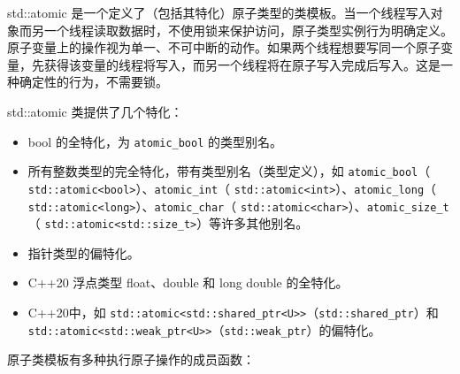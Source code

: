
std::atomic 是一个定义了（包括其特化）原子类型的类模板。当一个线程写入对象而另一个线程读取数据时，不使用锁来保护访问，原子类型实例行为明确定义。原子变量上的操作视为单一、不可中断的动作。如果两个线程想要写同一个原子变量，先获得该变量的线程将写入，而另一个线程将在原子写入完成后写入。这是一种确定性的行为，不需要锁。

std::atomic 类提供了几个特化：

\begin{itemize}
\item
bool 的全特化，为 \verb|atomic_bool| 的类型别名。

\item
所有整数类型的完全特化，带有类型别名（类型定义），如 \verb|atomic_bool|（ \verb|std::atomic<bool>|）、\verb|atomic_int|（ \verb|std::atomic<int>|）、\verb|atomic_long|（ \verb|std::atomic<long>|）、\verb|atomic_char|（ \verb|std::atomic<char>|）、\verb|atomic_size_t|（ \verb|std::atomic<std::size_t>|）等许多其他别名。

\item
指针类型的偏特化。

\item
C++20 浮点类型 float、double 和 long double 的全特化。

\item
C++20中，如 \verb|std::atomic<std::shared_ptr<U>>|（\verb|std::shared_ptr|）和 \verb|std::atomic<std::weak_ptr<U>>|（\verb|std::weak_ptr|）的偏特化。
\end{itemize}

原子类模板有多种执行原子操作的成员函数：

